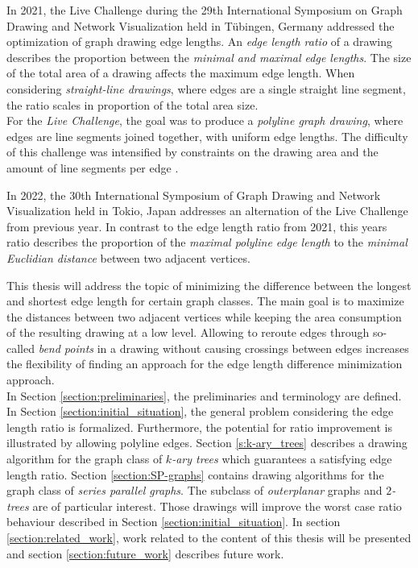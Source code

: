 \bigskip

In 2021, the Live Challenge during the 29th International Symposium on Graph Drawing and Network Visualization held in Tübingen, Germany addressed the optimization of graph drawing edge lengths. An \emph{edge length ratio} of a drawing describes the proportion between the \emph{minimal and maximal edge lengths}. The size of the total area of a drawing affects the maximum edge length. When considering \emph{straight-line drawings}, where edges are a single straight line segment, the ratio scales in proportion of the total area size.\\
For the \emph{Live Challenge}, the goal was to produce a \emph{polyline graph drawing}, where edges are line segments joined together, with uniform edge lengths. 
The difficulty of this challenge was intensified by constraints on the drawing area and the amount of line segments per edge \cite{GD:2021_Challenge}.

\bigskip


In 2022, the 30th International Symposium of Graph Drawing and Network Visualization held in Tokio, Japan \cite{GD:2022_Challenge} addresses an alternation of the Live Challenge from previous year. In contrast to the edge length ratio from 2021, this years ratio describes the proportion of the \emph{maximal polyline edge length} to the \emph{minimal Euclidian distance} between two adjacent vertices. 

\bigskip


This thesis will address the topic of minimizing the difference between the longest and shortest edge length for certain graph classes. The main goal is to maximize the distances between two adjacent vertices while keeping the area consumption of the resulting drawing at a low level. Allowing to reroute edges through so-called \emph{bend points} in a drawing without causing crossings between edges increases the flexibility of finding an approach for the edge length difference minimization approach.\\
In Section \ref{section:preliminaries}, the preliminaries and terminology are defined. 
In Section \ref{section:initial_situation}, the general problem considering the edge length ratio is formalized. Furthermore, the potential for ratio improvement is illustrated by allowing polyline edges. 
Section \ref{s:k-ary_trees} describes a drawing algorithm for the graph class of \emph{$k$-ary trees} which guarantees a satisfying edge length ratio.
Section \ref{section:SP-graphs} contains drawing algorithms for the graph class of \emph{series parallel graphs}. The subclass of \emph{outerplanar} graphs and \emph{$2$-trees} are of particular interest. Those drawings will improve the worst case ratio behaviour described in Section \ref{section:initial_situation}.
In section \ref{section:related_work}, work related to the content of this thesis will be presented and section \ref{section:future_work} describes future work.